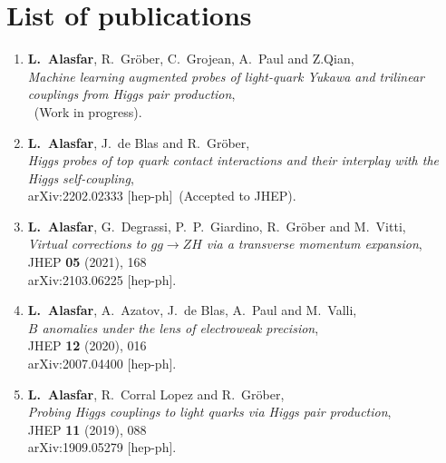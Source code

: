 
\chapter*{List of publications}
\begin{enumerate}
		\item \textbf{L.~Alasfar},  R.~Gr\"ober, C.~Grojean, A.~Paul and Z.Qian,\\
	\textit{Machine learning augmented probes of light-quark Yukawa and trilinear couplings from Higgs pair production}, \\
	~(Work in progress).
	
	\item \textbf{L.~Alasfar}, J.~de Blas and R.~Gr\"ober,\\
	\textit{Higgs probes of top quark contact interactions and their interplay with the Higgs self-coupling}, \\
	arXiv:2202.02333 [hep-ph]~(Accepted to JHEP).
 \item \textbf{L.~Alasfar}, G.~Degrassi, P.~P.~Giardino, R.~Gr\"ober and M.~Vitti,\\
 \textit{Virtual corrections to $gg\to ZH$ via a transverse momentum expansion},\\
 JHEP \textbf{05} (2021), 168\\ arXiv:2103.06225 [hep-ph].
\item \textbf{L.~Alasfar}, A.~Azatov, J.~de Blas, A.~Paul and M.~Valli,\\
\textit{$B$ anomalies under the lens of electroweak precision},\\
JHEP \textbf{12} (2020), 016\\
arXiv:2007.04400 [hep-ph].
\item \textbf{L.~Alasfar}, R.~Corral Lopez and R.~Gr\"ober,\\
\textit{Probing Higgs couplings to light quarks via Higgs pair production},\\
JHEP \textbf{11} (2019), 088\\
arXiv:1909.05279 [hep-ph].
\end{enumerate}%

%
